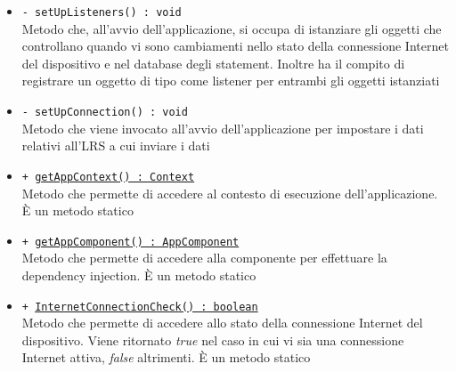 \documentclass[../Tesi.tex]{subfiles}
\begin{document}
\begin{description}
\begin{itemize}
				\item \texttt{- setUpListeners() : void}\\
				Metodo che, all'avvio dell'applicazione, si occupa di istanziare gli oggetti che controllano quando vi sono cambiamenti nello stato della connessione Internet del dispositivo e nel database degli statement. Inoltre ha il compito di registrare un oggetto di tipo  come listener per entrambi gli oggetti istanziati

				\item \texttt{- setUpConnection() : void}\\
				Metodo che viene invocato all'avvio dell'applicazione per impostare i dati relativi all'LRS a cui inviare i dati

				\item \texttt{+ \underline{getAppContext() : Context}}\\
				Metodo che permette di accedere al contesto di esecuzione dell'applicazione. È un metodo statico

				\item \texttt{+ \underline{getAppComponent() : AppComponent}}\\
				Metodo che permette di accedere alla componente per effettuare la dependency injection. È un metodo statico

				\item \texttt{+ \underline{InternetConnectionCheck() : boolean}}\\
				Metodo che permette di accedere allo stato della connessione Internet del dispositivo. Viene ritornato \textit{true} nel caso in cui vi sia una connessione Internet attiva, \textit{false} altrimenti. È un metodo statico
			\end{itemize}
		\end{description}
\end{document}
